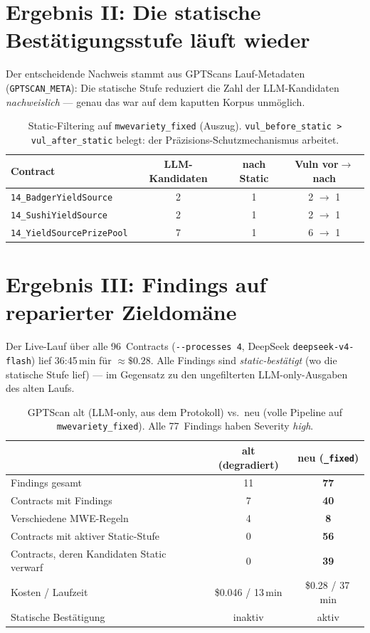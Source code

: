 \documentclass[11pt,a4paper]{scrartcl}
\newcommand{\code}[1]{\texttt{#1}}
\begin{document}
\section{Ergebnis II: Die statische Bestätigungsstufe läuft wieder}

Der entscheidende Nachweis stammt aus GPTScans Lauf-Metadaten (\code{GPTSCAN\_META}):
Die statische Stufe reduziert die Zahl der LLM-Kandidaten \emph{nachweislich} ---
genau das war auf dem kaputten Korpus unmöglich.

\begin{table}[h]
\centering
\begin{tabular}{@{}lccc@{}}
\toprule
Contract & LLM-Kandidaten & nach Static & Vuln vor$\to$nach \\
\midrule
\code{14\_BadgerYieldSource}    & 2 & 1 & 2 $\to$ 1 \\
\code{14\_SushiYieldSource}     & 2 & 1 & 2 $\to$ 1 \\
\code{14\_YieldSourcePrizePool} & 7 & 1 & 6 $\to$ 1 \\
\bottomrule
\end{tabular}
\caption{Static-Filtering auf \code{mwevariety\_fixed} (Auszug). \code{vul\_before\_static
> vul\_after\_static} belegt: der Präzisions-Schutzmechanismus arbeitet.}
\end{table}

\section{Ergebnis III: Findings auf reparierter Zieldomäne}

Der Live-Lauf über alle 96~Contracts (\code{-{}-processes 4}, DeepSeek
\code{deepseek-v4-flash}) lief 36:45\,min für ${\approx}\$0.28$. Alle Findings sind
\emph{static-bestätigt} (wo die statische Stufe lief) --- im Gegensatz zu den
ungefilterten LLM-only-Ausgaben des alten Laufs.

\begin{table}[h]
\centering
\begin{tabular}{@{}lcc@{}}
\toprule
 & \textbf{alt (degradiert)} & \textbf{neu (\code{\_fixed})} \\
\midrule
Findings gesamt          & 11 & \textcolor{good}{\textbf{77}} \\
Contracts mit Findings   & 7  & \textcolor{good}{\textbf{40}} \\
Verschiedene MWE-Regeln  & 4  & \textcolor{good}{\textbf{8}} \\
Contracts mit aktiver Static-Stufe & 0 & \textcolor{good}{\textbf{56}} \\
Contracts, deren Kandidaten Static verwarf & 0 & \textbf{39} \\
Kosten / Laufzeit        & \$0.046 / 13\,min & \$0.28 / 37\,min \\
Statische Bestätigung    & \textcolor{bad}{inaktiv} & \textcolor{good}{aktiv} \\
\bottomrule
\end{tabular}
\caption{GPTScan alt (LLM-only, aus dem Protokoll) vs.\ neu (volle Pipeline auf
\code{mwevariety\_fixed}). Alle 77~Findings haben Severity \emph{high}.}
\end{table}
\end{document}
